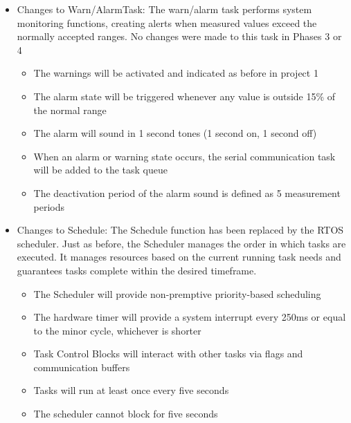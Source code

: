 \documentclass[12pt]{article} %
\begin{document}
\begin{itemize}
  \item Changes to Warn/AlarmTask:
		The warn/alarm task performs system monitoring functions, creating alerts when measured values exceed the normally accepted ranges.
		No changes were made to this task in Phases 3 or 4
    \begin{itemize}
      \item The warnings will be activated and indicated as before in project 1
      \item The alarm state will be triggered whenever any value is outside 15\% of the normal range
      \item The alarm will sound in 1 second tones (1 second on, 1 second off)
      \item When an alarm or warning state occurs, the serial communication
	task will be added to the task queue
      \item The deactivation period of the alarm sound is defined as 5
	measurement periods
    \end{itemize}

  \item Changes to Schedule:
		The Schedule function has been replaced by the RTOS scheduler. Just as
		before, the Scheduler manages the order in which tasks are executed. It
		manages resources based on the current running task needs and guarantees
		tasks complete within the desired timeframe.
    \begin{itemize}
			\item The Scheduler will provide non-premptive priority-based scheduling
      \item The hardware timer will provide a system interrupt every 250ms or
	equal to the minor cycle, whichever is shorter
      \item Task Control Blocks will interact with other tasks via flags and communication buffers
			\item Tasks will run at least once every five seconds
      \item The scheduler cannot block for five seconds
    \end{itemize}


\end{itemize}
\end{document}

